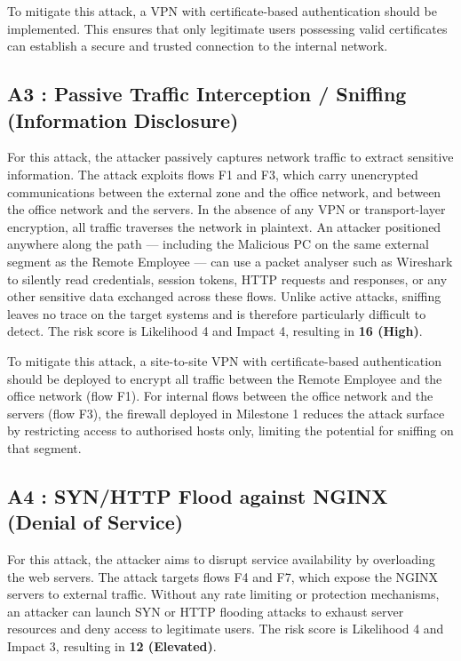 \documentclass[a4paper,12pt]{article}
\begin{document}
To mitigate this attack, a VPN with certificate-based
authentication should be implemented. This ensures that only legitimate
users possessing valid certificates can establish a secure and trusted
connection to the internal network.

\subsection{A3 : Passive Traffic Interception / Sniffing (Information Disclosure)}

For this attack, the attacker passively captures network traffic to
extract sensitive information. The attack exploits flows F1 and F3,
which carry unencrypted communications between the external zone and
the office network, and between the office network and the servers.
In the absence of any VPN or transport-layer encryption, all traffic
traverses the network in plaintext. An attacker positioned anywhere
along the path --- including the Malicious PC on the same external
segment as the Remote Employee --- can use a packet analyser such as
Wireshark to silently read credentials, session tokens, HTTP requests
and responses, or any other sensitive data exchanged across these
flows. Unlike active attacks, sniffing leaves no trace on the target
systems and is therefore particularly difficult to detect. The risk
score is Likelihood 4 and Impact 4, resulting in \textbf{16 (High)}.

To mitigate this attack, a site-to-site VPN with certificate-based
authentication should be deployed to encrypt all traffic between
the Remote Employee and the office network (flow F1). For internal flows between the office network and the servers (flow F3), the firewall deployed in Milestone 1 reduces the attack surface by restricting access to authorised hosts only, limiting the potential for sniffing on that segment.

\subsection{A4 : SYN/HTTP Flood against NGINX (Denial of Service)}

For this attack, the attacker aims to disrupt service availability by
overloading the web servers. The attack targets flows F4 and F7, which
expose the NGINX servers to external traffic. Without any rate limiting
or protection mechanisms, an attacker can launch SYN or HTTP flooding
attacks to exhaust server resources and deny access to legitimate users.
The risk score is Likelihood 4 and Impact 3, resulting in
\textbf{12 (Elevated)}.
\end{document}
